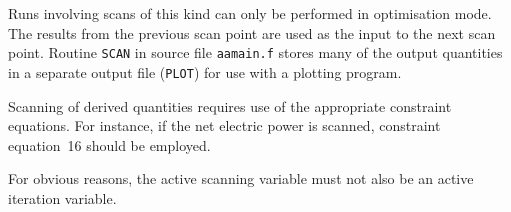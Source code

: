 \documentclass[11pt,a4paper]{report}
\begin{document}
Runs involving scans of this kind can only be performed in optimisation mode.
The results from the previous scan point are used as the input to the next
scan point. Routine {\tt SCAN} in source file {\tt aamain.f} stores many of
the output quantities in a separate output file (\texttt{PLOT}) for use with a
plotting program.

Scanning of derived quantities requires use of the appropriate constraint
equations. For instance, if the net electric power is scanned, constraint
equation~16 should be employed.

For obvious reasons, the active scanning variable must not also be an active
iteration variable.


\begin{table}[tbph]
\begin{center}


\end{center}
\end{table}
\end{document}
